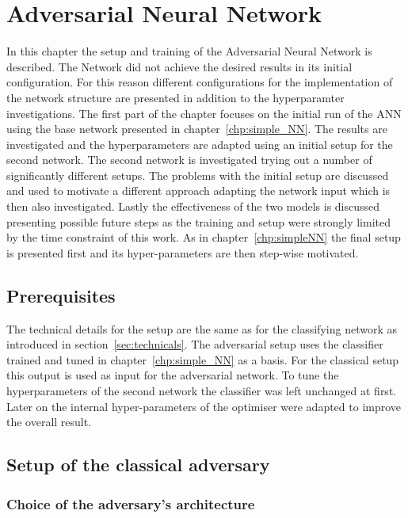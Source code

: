 \chapter{Adversarial Neural Network}
\label{chp:ANN}

In this chapter the setup and training of the Adversarial Neural Network is described. The Network did not achieve the desired results in its initial configuration.
For this reason different configurations for the implementation of the network structure are presented in addition to the hyperparamter investigations.
The first part of the chapter focuses on the initial run of the ANN using the base network presented in chapter~\ref{chp:simple_NN}. The results are investigated and the hyperparameters are adapted using an initial setup for the second network.
The second network is investigated trying out a number of significantly different setups.
The problems with the initial setup are discussed and used to motivate a different approach adapting the network input which is then also investigated.
Lastly the effectiveness of the two models is discussed presenting possible future steps as the training and setup were strongly limited by the time constraint of this work.
As in chapter~\ref{chp:simpleNN} the final setup is presented first and its hyper-parameters are then step-wise motivated. 
\section{Prerequisites}

The technical details for the setup are the same as for the classifying network as introduced in section~\ref{sec:technicals}.
The adversarial setup uses the classifier trained and tuned in chapter~\ref{chp:simple_NN} as a basis. For the classical setup this output is used as input for the adversarial network.
To tune the hyperparameters of the second network the classifier was left unchanged at first. Later on the internal hyper-parameters of the optimiser were adapted to improve the overall result.



\section{Setup of the classical adversary}

\subsection{Choice of the adversary's architecture}


